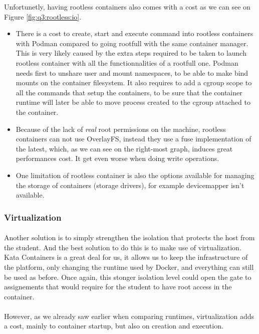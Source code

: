 Unfortunetly, having rootless containers also comes with a cost as we can see on Figure \ref{fig:q3:rootless:io}.
\begin{itemize}
  \item There is a cost to create, start and execute command into rootless containers with Podman compared to going rootfull with the same container manager.  This is very likely caused by the extra steps required to be taken to launch rootless container with all the functionnalities of a rootfull one.  Podman needs first to unshare user and mount namespaces, to be able to make bind mounts on the container filesystem.  It also requires to add a cgroup scope to all the commands that setup the containers, to be sure that the container runtime will later be able to move process created to the cgroup attached to the container.
  \item Because of the lack of \textit{real} root permissions on the machine, rootless containers can not use OverlayFS, instead they use a fuse implementation of the latest, which, as we can see on the right-most graph, induces great performances cost.  It get even worse when doing write operations.
  \item One limitation of rootless container is also the options available for managing the storage of containers (storage drivers), for example devicemapper isn't available.
\end{itemize}

\subsubsection{Virtualization}
\paragraph{}Another solution is to simply strengthen the isolation that protects the host from the student.  And the best solution to do this is to make use of virtualization.  Kata Containers is a great deal for us, it allows us to keep the infrastructure of the platform, only changing the runtime used by Docker, and everything can still be used as before.  Once again, this stonger isolation level could open the gate to assignements that would require for the student to have root access in the container.

\paragraph{}However, as we already saw earlier when comparing runtimes, virtualization adds a cost, mainly to container startup, but also on creation and execution.

